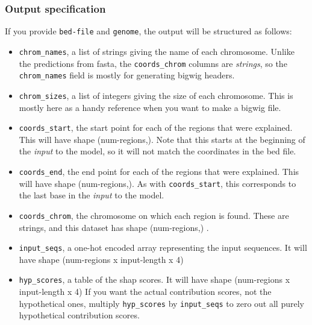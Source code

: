 \documentclass{article}
\begin{document}
\subsubsection{Output specification}

If you provide \texttt{bed-file} and \texttt{genome}, the output will be structured as follows:

\begin{itemize}
    \item \begin{sloppypar}\texttt{chrom\_names}, a list of strings giving the name of each chromosome.
            Unlike the predictions from fasta, the \texttt{coords\_chrom} columns are
            \emph{strings}, so the \texttt{chrom\_names} field is mostly for generating bigwig
    headers.\end{sloppypar}
        \item \texttt{chrom\_sizes}, a list of integers giving the size of each chromosome.
            This is mostly here as a handy reference when you want to make a bigwig file.
        \item \texttt{coords\_start}, the start point for each of the regions that were explained.
            This will have shape (num-regions,). Note that this starts at the beginning of the
            \emph{input} to the model, so it will not match the coordinates in the bed file.
        \item \texttt{coords\_end}, the end point for each of the regions that were explained.
            This will have shape (num-regions,).
            As with \texttt{coords\_start}, this corresponds to the last base in the
            \emph{input} to the model.
        \item \texttt{coords\_chrom}, the chromosome on which each region is found.
            These are strings, and this dataset has shape (num-regions,)
            .\label{dep:interpretChroms}
        \item \texttt{input\_seqs}, a one-hot encoded array representing the input sequences.
            It will have shape (num-regions x input-length x 4)
        \item \texttt{hyp\_scores}, a table of the shap scores. It will have shape
            (num-regions x input-length x 4) If you want the actual contribution scores, not the
            hypothetical ones, multiply \texttt{hyp\_scores} by \texttt{input\_seqs} to zero out
            all purely hypothetical contribution scores.

\end{itemize}
\end{document}
